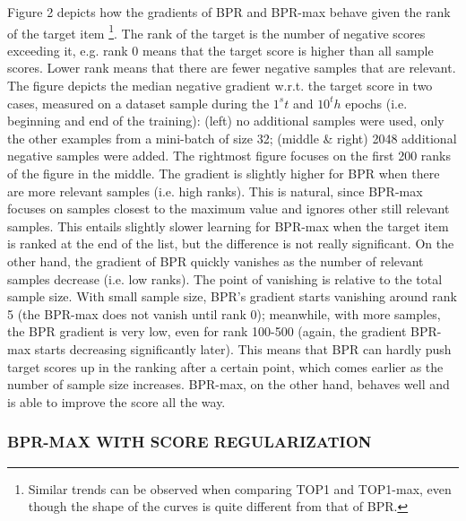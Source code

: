 \documentclass{article} %
\begin{document}
Figure 2 depicts how the gradients of BPR and BPR-max behave given the rank of the target item \footnote[8]{Similar trends can be observed when comparing TOP1 and TOP1-max, even though the shape of the curves
is quite different from that of BPR.}.
The rank of the target is the number of negative scores exceeding it, e.g. rank 0 means that the target score is higher than all sample scores. Lower rank means that there are fewer negative samples that are relevant. The figure depicts the median negative gradient w.r.t. the target score in two cases, measured on a dataset sample during the $1^st$ and $10^th$ epochs (i.e. beginning and end of the training): (left) no additional samples were used, only the other examples from a mini-batch of size 32; (middle & right) 2048 additional negative samples were added. The rightmost figure focuses on the first 200 ranks of the figure in the middle. The gradient is slightly higher for BPR when there are more relevant samples (i.e. high ranks). This is natural, since BPR-max focuses on samples closest to the maximum value and ignores other still relevant samples. This entails slightly slower learning for BPR-max when the target item is ranked at the end of the list, but the difference is not really significant. On the other hand, the gradient of BPR quickly vanishes as the number of relevant samples decrease (i.e. low ranks). The point of vanishing is relative to the total sample size. With small sample size, BPR’s gradient starts vanishing around rank 5 (the BPR-max does not vanish until rank 0); meanwhile, with more samples, the BPR gradient is very low, even for rank 100-500 (again, the gradient BPR-max starts decreasing significantly later). This means that BPR can hardly push target scores up in the ranking after a certain point, which comes earlier as the number of sample size increases. BPR-max, on the other hand, behaves well and is able to improve the score all the way.

\subsubsection{ BPR-MAX WITH SCORE REGULARIZATION}
\end{document}
